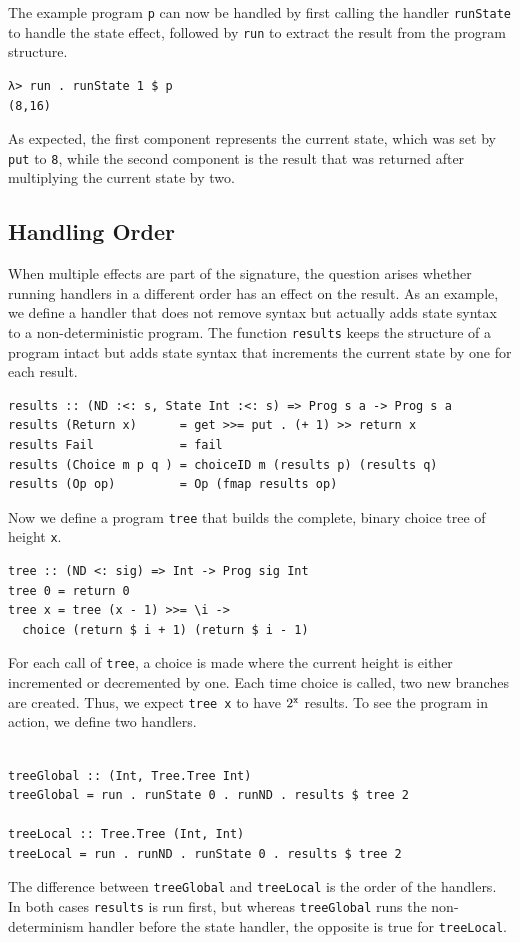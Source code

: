 \documentclass[a4paper, 11pt, fleqn, twoside, abstract=on]{scrreprt}
\newcommand{\hinl}[1]{\texttt{#1}}
\begin{document}
The example program \hinl{p} can now be handled by first calling the handler \hinl{runState} to handle the state effect, followed by \hinl{run} to extract the result from the program structure.

\begin{verbatim}
λ> run . runState 1 $ p
(8,16)
\end{verbatim}
\noindent
As expected, the first component represents the current state, which was set by \hinl{put} to \hinl{8}, while the second component is the result that was returned after multiplying the current state by two.

\subsection{Handling Order}
When multiple effects are part of the signature, the question arises whether running handlers in a different order has an effect on the result.
As an example, we define a handler that does not remove syntax but actually adds state syntax to a non-deterministic program.
The function \hinl{results} keeps the structure of a program intact but adds state syntax that increments the current state by one for each result.

\begin{verbatim}
results :: (ND :<: s, State Int :<: s) => Prog s a -> Prog s a
results (Return x)      = get >>= put . (+ 1) >> return x
results Fail            = fail
results (Choice m p q ) = choiceID m (results p) (results q)
results (Op op)         = Op (fmap results op)
\end{verbatim}

Now we define a program \hinl{tree} that builds the complete, binary choice tree of height \hinl{x}.

\begin{verbatim}
tree :: (ND <: sig) => Int -> Prog sig Int
tree 0 = return 0
tree x = tree (x - 1) >>= \i -> 
  choice (return $ i + 1) (return $ i - 1)
\end{verbatim}
\noindent
For each call of \hinl{tree}, a choice is made where the current height is either incremented or decremented by one.
Each time choice is called, two new branches are created.
Thus, we expect \hinl{tree x} to have $2^\text{\hinl{x}}$ results.
To see the program in action, we define two handlers.
\begin{verbatim}

treeGlobal :: (Int, Tree.Tree Int)
treeGlobal = run . runState 0 . runND . results $ tree 2

treeLocal :: Tree.Tree (Int, Int)
treeLocal = run . runND . runState 0 . results $ tree 2
\end{verbatim}
\noindent
The difference between \hinl{treeGlobal} and \hinl{treeLocal} is the order of the handlers.
In both cases \hinl{results} is run first, but whereas \hinl{treeGlobal} runs the non-determinism handler before the state handler, the opposite is true for \hinl{treeLocal}.
\end{document}
